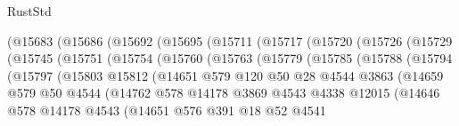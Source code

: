 \begin{lexlean}{RustStd}
\begin{coremodule}
            (@15683
              (@15686
                (@15692
                  (@15695
                    (@15711
                      (@15717
                        (@15720
                          (@15726
                            (@15729
                              (@15745
                                (@15751
                                  (@15754
                                    (@15760
                                      (@15763
                                        (@15779
                                          (@15785
                                            (@15788
                                              (@15794
                                                (@15797
                                                  (@15803
                                                    @15812
                                                    (@14651
                                                      @579
                                                      @120
                                                      @50
                                                      @28
                                                      @4544
                                                      @3863
                                                      (@14659
                                                        @579
                                                        @50
                                                        @4544
                                                        (@14762
                                                          @578
                                                          @14178
                                                          @3869
                                                          @4543
                                                          @4338
                                                          @12015
                                                          (@14646
                                                            @578
                                                            @14178
                                                            @4543
                                                            (@14651
                                                              @576
                                                              @391
                                                              @18
                                                              @52
                                                              @4541

\end{coremodule}
\end{lexlean}
